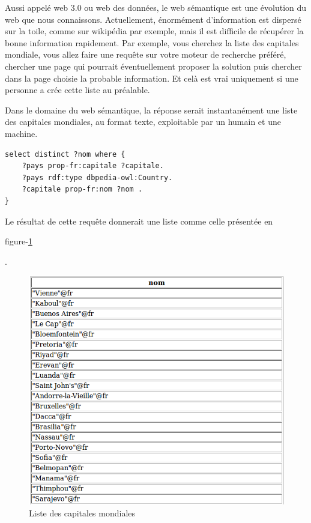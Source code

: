 \documentclass[a4paper]{article}
\begin{document}
Aussi appelé web 3.0 ou web des données, le web sémantique est une évolution du
web que nous connaissons. Actuellement, énormément d'information est dispersé
sur la toile, comme sur wikipédia par exemple, mais il est difficile de
récupérer la bonne information rapidement. Par exemple, vous cherchez la liste
des capitales mondiale, vous allez faire une requête sur votre moteur de
recherche préféré, chercher une page qui pourrait éventuellement proposer la
solution puis chercher dans la page choisie la probable information. Et celà est
vrai uniquement si une personne a crée cette liste au préalable.

Dans le domaine du web sémantique, la réponse serait instantanément une liste
des capitales mondiales, au format texte, exploitable par un humain et une
machine.

\begin{lstlisting}[caption=Requête SPARQL récupérant la liste des capitales
mondiales, language=SPARQL]
select distinct ?nom where {
	?pays prop-fr:capitale ?capitale.
	?pays rdf:type dbpedia-owl:Country.
	?capitale prop-fr:nom ?nom .
}
\end{lstlisting}

Le résultat de cette requête donnerait une liste comme celle
présentée en \begin{textsc}figure-\ref{cap} \end{textsc}.

\begin{figure}[h]
    \centering
    \includegraphics[scale=0.70]{img/capitales.png}
    \caption{\label{cap} Liste des capitales mondiales}
\end{figure}
\end{document}
